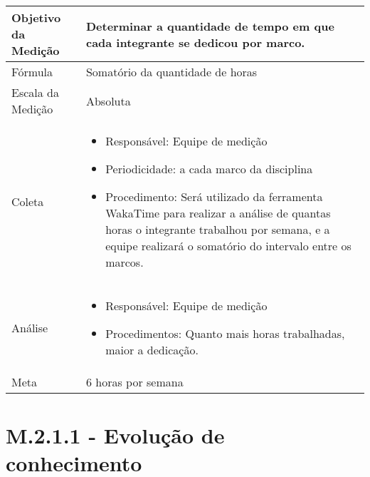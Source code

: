 	\begin{tabular}{ |p{4cm}|p{8cm}|  }
	 \hline
	 Objetivo da Medição 		& Determinar a quantidade de tempo em que cada integrante se dedicou por marco.	   \\ %
	 \hline
	 Fórmula		&  Somatório da quantidade de horas	\\
	 \hline
	 Escala da Medição 		& Absoluta		 \\
	 \hline
	 Coleta		& 	\begin{itemize} \item Responsável: Equipe de medição \item Periodicidade: a cada marco da disciplina \item Procedimento: Será utilizado da ferramenta WakaTime para realizar a análise de quantas horas o integrante trabalhou por semana, e a equipe realizará o somatório do intervalo entre os marcos.\end{itemize}	\\
	 \hline
	 Análise		& 	\begin{itemize} \item Responsável: Equipe de medição \item Procedimentos: Quanto mais horas trabalhadas, maior a dedicação. \end{itemize}	 \\
	 \hline
	 Meta		& 	6 horas por semana	 \\
	 \hline
	\end{tabular}

	\section{M.2.1.1 - Evolução de conhecimento} %

